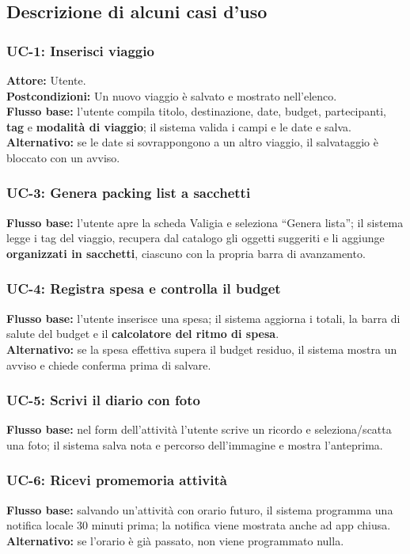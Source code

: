 \documentclass[11pt, a4paper]{article}
\begin{document}
\subsection{Descrizione di alcuni casi d'uso}

\subsubsection*{UC-1: Inserisci viaggio}
\textbf{Attore:} Utente.\\
\textbf{Postcondizioni:} Un nuovo viaggio è salvato e mostrato nell'elenco.\\
\textbf{Flusso base:} l'utente compila titolo, destinazione, date, budget,
partecipanti, \textbf{tag} e \textbf{modalità di viaggio}; il sistema valida i
campi e le date e salva.\\
\textbf{Alternativo:} se le date si sovrappongono a un altro viaggio, il
salvataggio è bloccato con un avviso.

\subsubsection*{UC-3: Genera packing list a sacchetti}
\textbf{Flusso base:} l'utente apre la scheda Valigia e seleziona ``Genera
lista''; il sistema legge i tag del viaggio, recupera dal catalogo gli oggetti
suggeriti e li aggiunge \textbf{organizzati in sacchetti}, ciascuno con la propria
barra di avanzamento.

\subsubsection*{UC-4: Registra spesa e controlla il budget}
\textbf{Flusso base:} l'utente inserisce una spesa; il sistema aggiorna i totali,
la barra di salute del budget e il \textbf{calcolatore del ritmo di spesa}.\\
\textbf{Alternativo:} se la spesa effettiva supera il budget residuo, il sistema
mostra un avviso e chiede conferma prima di salvare.

\subsubsection*{UC-5: Scrivi il diario con foto}
\textbf{Flusso base:} nel form dell'attività l'utente scrive un ricordo e
seleziona/scatta una foto; il sistema salva nota e percorso dell'immagine e mostra
l'anteprima.

\subsubsection*{UC-6: Ricevi promemoria attività}
\textbf{Flusso base:} salvando un'attività con orario futuro, il sistema programma
una notifica locale 30 minuti prima; la notifica viene mostrata anche ad app
chiusa.\\
\textbf{Alternativo:} se l'orario è già passato, non viene programmato nulla.
\end{document}
